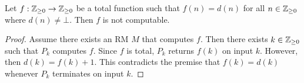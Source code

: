 \documentclass{article}
\begin{document}
\begin{claim*}
    Let $f:\mathbb{Z}_{\geq 0}\to\mathbb{Z}_{\geq 0}$ be a total function such that $f(n)=d(n)$ for all $n\in\mathbb{Z}_{\geq 0}$ where 
    $d(n)\not=\bot$. Then $f$ is not computable.
    \begin{proof}
        Assume there exists an RM $M$ that computes $f$. Then there exists $k\in\mathbb{Z}_{\geq 0}$ such that 
        $P_k$ computes $f$. Since $f$ is total, $P_k$ returns $f(k)$ on input $k$. However,
        then $d(k)=f(k)+1$. This contradicts the premise that $f(k)=d(k)$ whenever $P_k$ terminates 
        on input $k$.
    \end{proof}
\end{claim*}
\end{document}
